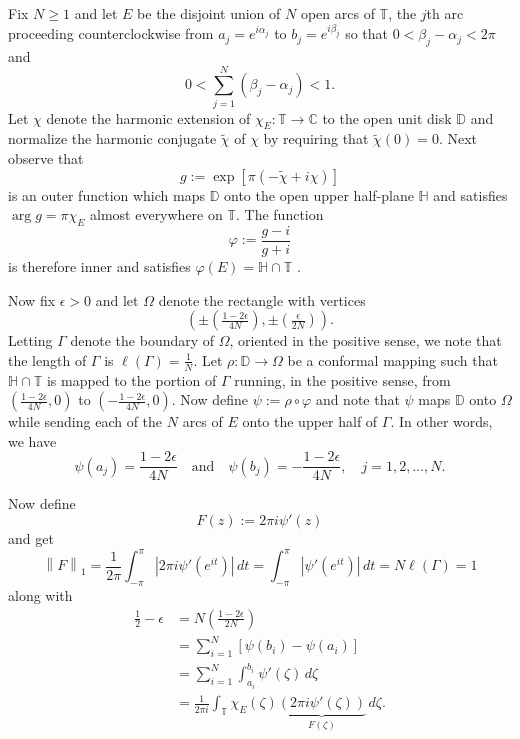 \documentclass[11pt,reqno]{amsart}
\numberwithin{equation}{section}
\theoremstyle{plain}
\theoremstyle{definition}
\begin{document}
	Fix $N \geq 1$ and let $E$ be the disjoint union of $N$ open arcs of ${\mathbb{T}}$, the $j$th arc proceeding counterclockwise from
	$a_j = e^{i\alpha_j}$ to $b_j = e^{i \beta_j}$ so that $0 <\beta_j - \alpha_j < 2 \pi$ and 
	\begin{equation*}
		0 <  \sum_{j=1}^N (\beta_j - \alpha_j)  < 1.
	\end{equation*}
	Let $\chi$ denote the harmonic extension of $\chi_E:{\mathbb{T}}\to{ \mathbb{C}}$
	to the open unit disk ${ \mathbb{D}}$ and normalize the harmonic conjugate $\widetilde{ \chi }$ of $\chi$ by 
	requiring that $\widetilde{ \chi}(0) = 0$. Next observe that
	\begin{equation*}
		g := \exp\left[  \pi ( - \widetilde{\chi} + i \chi ) \right]
	\end{equation*}
	is an outer function which maps ${ \mathbb{D}}$ onto the open upper half-plane $\mathbb{H}$
	and satisfies $\arg g = \pi \chi_E$ almost everywhere on ${\mathbb{T}}$.  The function
	\begin{equation*}
		{\varphi} := \frac{g - i}{g + i}
	\end{equation*}
	is therefore inner and satisfies ${\varphi}(E) = \mathbb{H} \cap {\mathbb{T}}$ \cite{MR2021044}.
	
	Now fix $\epsilon > 0$ and let $\Omega$ denote the rectangle with vertices
	$$\left( \pm \left( \tfrac{1 - 2\epsilon}{4 N} \right), \pm \left( \tfrac{ \epsilon}{2 N} \right) \right).$$
		Letting $\Gamma$ denote the boundary of $\Omega$, oriented in the positive sense,
	we note that the length of $\Gamma$ is $\ell(\Gamma) = \frac{1}{N}$.
	Let $\rho:{ \mathbb{D}}\to\Omega$ be a conformal mapping such that $\mathbb{H} \cap {\mathbb{T}}$ is mapped
	to the portion of $\Gamma$ running, in the positive sense,
	from $( \frac{1-2\epsilon}{4 N},0)$ to $(- \frac{1-2\epsilon}{4 N},0)$.
	Now define $\psi := \rho \circ  {\varphi}$ and note that $\psi$ maps ${ \mathbb{D}}$ onto $\Omega$
	while sending each of the $N$ arcs of $E$ onto the upper half of $\Gamma$.
	In other words, we have 
	$$\psi(a_j) = \frac{1-2\epsilon}{4 N} \quad \mbox{and}\quad \psi(b_j) = -\frac{1-2\epsilon}{4 N}, \quad j=1,2,\ldots, N.$$
	
	Now define 
	$$F(z) := 2 \pi i \psi'(z)$$ and get 
	\begin{equation*}
		{\left\| {F} \right\|}_1 =
		\frac{1}{2\pi} \int_{-\pi}^{\pi} |2 \pi i \psi'(e^{it})|\,dt
		= \int_{-\pi}^{\pi} |\psi'(e^{it})|\,dt = N \ell(\Gamma) = 1
	\end{equation*} along with
	\begin{align*}
		\tfrac{1}{2} - \epsilon
		&= N \left( \frac{1 - 2\epsilon}{2 N} \right) \\
		&= \sum_{i=1}^N [\psi(b_i) - \psi(a_i) ] \\
		&= \sum_{i=1}^N \int_{a_i}^{b_i} \psi'(\zeta)\,d\zeta\\
		&=  \frac{1}{2 \pi i} \int_{\mathbb{T}} \chi_E(\zeta) \underbrace{ (2 \pi i \psi'(\zeta) )}_{F(\zeta)}\,d\zeta.
	\end{align*}
\end{document}
